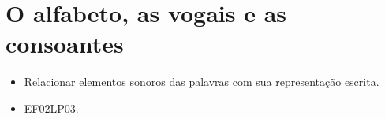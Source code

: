 \pagestyle{por}
\chapter{O alfabeto, as vogais e as consoantes}


\begin{itemize}
\item Relacionar elementos sonoros das palavras com sua representação escrita.
\end{itemize}


\begin{itemize}
\item EF02LP03.
\end{itemize}

